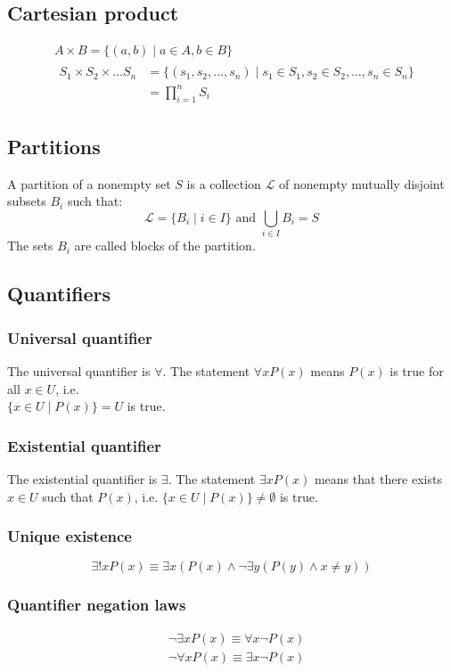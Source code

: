 \documentclass{article}
\begin{document}
\subsection{Cartesian product}
\begin{align*}
	&A\times B = \{(a,b)\mid a\in A, b\in B\}\\
	&\begin{aligned} S_1\times S_2\times\ldots S_n&=\{(s_1,s_2,\ldots,s_n)\mid s_1\in S_1, s_2\in S_2,\ldots, s_n\in S_n\}\\
	&=\prod_{i=1}^{n}S_i\end{aligned}
\end{align*}
\subsection{Partitions}
A partition of a nonempty set \(S\) is a collection \(\mathscr{L}\) of nonempty mutually disjoint subsets \(B_i\) such that:
\begin{displaymath}
	\mathscr{L}=\{B_i \mid i\in I\} \text{ and } \bigcup_{i\in I}B_i=S
\end{displaymath}
The sets \(B_i\) are called blocks of the partition.
\subsection{Quantifiers}
\subsubsection{Universal quantifier}
The universal quantifier is \(\forall\). The statement \(\forall xP(x)\) means \(P(x)\) is true for all \(x\in U\), i.e.\\\(\{x\in U\mid P(x)\}=U\) is true.
\subsubsection{Existential quantifier}
The existential quantifier is \(\exists\). The statement \(\exists xP(x)\) means that there exists \(x\in U\) such that \(P(x)\), i.e. \(\{x\in U\mid P(x)\}\neq\emptyset\) is true.
\subsubsection{Unique existence}
\begin{displaymath}
	\exists !xP(x)\equiv \exists x(P(x)\wedge\neg\exists y(P(y)\wedge x\neq y))
\end{displaymath}
\subsubsection{Quantifier negation laws}
\begin{align*}
	&\neg\exists xP(x)\equiv\forall x\neg P(x)\\
	&\neg\forall xP(x)\equiv\exists x\neg P(x)
\end{align*}
\end{document}

